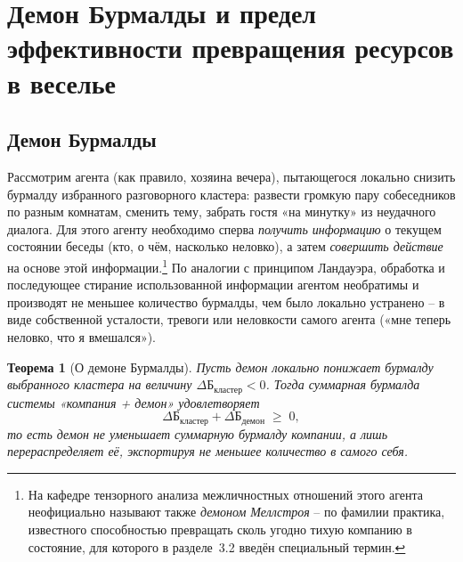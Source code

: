 \documentclass[11pt,a4paper]{article}
\newtheorem{theorem}{Теорема}
\newcommand{\Burm}{\text{Б}}
\begin{document}
\section{Демон Бурмалды и предел эффективности превращения ресурсов в веселье}

\subsection{Демон Бурмалды}

Рассмотрим агента (как правило, хозяина вечера), пытающегося локально снизить бурмалду избранного разговорного кластера: развести громкую пару собеседников по разным комнатам, сменить тему, забрать гостя «на минутку» из неудачного диалога. Для этого агенту необходимо сперва \emph{получить информацию} о текущем состоянии беседы (кто, о чём, насколько неловко), а затем \emph{совершить действие} на основе этой информации.\footnote{На кафедре тензорного анализа межличностных отношений этого агента неофициально называют также \emph{демоном Меллстроя} -- по фамилии практика, известного способностью превращать сколь угодно тихую компанию в состояние, для которого в разделе~3.2 введён специальный термин.} По аналогии с принципом Ландауэра, обработка и последующее стирание использованной информации агентом необратимы и производят не меньшее количество бурмалды, чем было локально устранено -- в виде собственной усталости, тревоги или неловкости самого агента («мне теперь неловко, что я вмешался»).

\begin{theorem}[О демоне Бурмалды]
Пусть демон локально понижает бурмалду выбранного кластера на величину $\Delta\Burm_{\text{кластер}}<0$. Тогда суммарная бурмалда системы «компания + демон» удовлетворяет
\[
\Delta\Burm_{\text{кластер}} + \Delta\Burm_{\text{демон}} \;\geq\; 0,
\]
то есть демон не уменьшает суммарную бурмалду компании, а лишь перераспределяет её, экспортируя не меньшее количество в самого себя.
\end{theorem}
\end{document}
